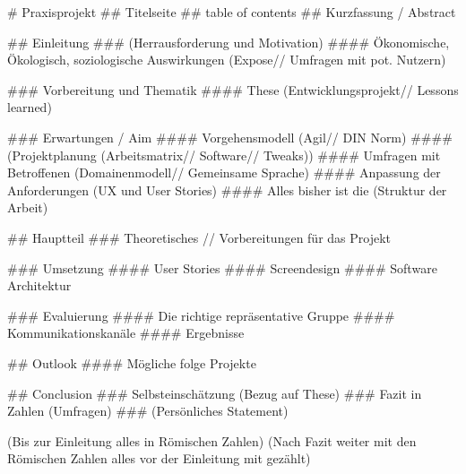 # Praxisprojekt
## Titelseite
## table of contents
## Kurzfassung / Abstract 

## Einleitung
    ### (Herrausforderung und Motivation)
        #### Ökonomische, Ökologisch, soziologische Auswirkungen (Expose// Umfragen mit pot. Nutzern)
    
    ### Vorbereitung und Thematik
        #### These (Entwicklungsprojekt// Lessons learned)
        
     ### Erwartungen / Aim
        #### Vorgehensmodell (Agil// DIN Norm)
        #### (Projektplanung (Arbeitsmatrix// Software// Tweaks))
        #### Umfragen mit Betroffenen (Domainenmodell// Gemeinsame Sprache)
        #### Anpassung der Anforderungen (UX und User Stories)
        #### { Alles bisher ist die }(Struktur der Arbeit)
        
## Hauptteil
    ### Theoretisches // Vorbereitungen für das Projekt

    ### Umsetzung
        #### User Stories
        #### Screendesign
        #### Software Architektur
    
    ### Evaluierung
        #### Die richtige repräsentative Gruppe
        #### Kommunikationskanäle
        #### Ergebnisse

## Outlook
    #### Mögliche folge Projekte
        
## Conclusion
    ### Selbsteinschätzung (Bezug auf These)
    ### Fazit in Zahlen (Umfragen)
    ### (Persönliches Statement)
    
    
(Bis zur Einleitung alles in Römischen Zahlen)
(Nach Fazit weiter mit den Römischen Zahlen alles vor der Einleitung mit gezählt)


